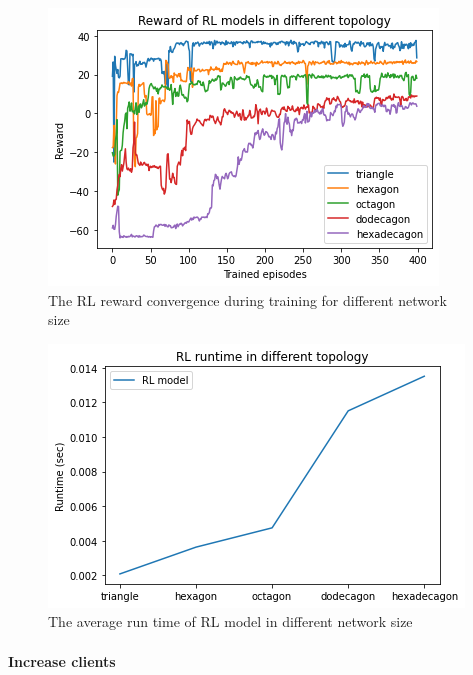 \documentclass[conference]{IEEEtran}
\begin{document}
\begin{figure}[]
    \centering
    \includegraphics[scale = 0.5]{imgs/reward_different_topology.png}
    \caption{The RL reward convergence during training for different network size}
    \label{fig:reward_different_topology}
\end{figure}

\begin{figure}[]
    \centering
    \includegraphics[scale = 0.5]{imgs/runtime_topology.png}
    \caption{The average run time of RL model in different network size}
    \label{fig:runtime_topology}
\end{figure}

\paragraph{Increase clients}
\end{document}
